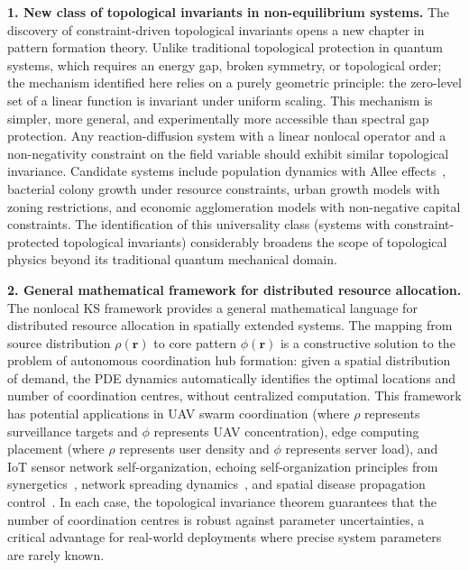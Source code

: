 \documentclass[sn-nature,pdflatex]{sn-jnl}
\begin{document}
\textbf{1. New class of topological invariants in non-equilibrium systems.}
The discovery of constraint-driven topological invariants opens a new chapter in pattern formation theory. Unlike traditional topological protection in quantum systems, which requires an energy gap, broken symmetry, or topological order; the mechanism identified here relies on a purely geometric principle: the zero-level set of a linear function is invariant under uniform scaling. This mechanism is simpler, more general, and experimentally more accessible than spectral gap protection. Any reaction-diffusion system with a linear nonlocal operator and a non-negativity constraint on the field variable should exhibit similar topological invariance. Candidate systems include population dynamics with Allee effects~\cite{meron_2015}, bacterial colony growth under resource constraints, urban growth models with zoning restrictions, and economic agglomeration models with non-negative capital constraints. The identification of this universality class (systems with constraint-protected topological invariants) considerably broadens the scope of topological physics beyond its traditional quantum mechanical domain.

\textbf{2. General mathematical framework for distributed resource allocation.}
The nonlocal KS framework provides a general mathematical language for distributed resource allocation in spatially extended systems. The mapping from source distribution $\rho(\mathbf{r})$ to core pattern $\phi(\mathbf{r})$ is a constructive solution to the problem of autonomous coordination hub formation: given a spatial distribution of demand, the PDE dynamics automatically identifies the optimal locations and number of coordination centres, without centralized computation. This framework has potential applications in UAV swarm coordination (where $\rho$ represents surveillance targets and $\phi$ represents UAV concentration), edge computing placement (where $\rho$ represents user density and $\phi$ represents server load), and IoT sensor network self-organization, echoing self-organization principles from synergetics~\cite{haken_1983}, network spreading dynamics~\cite{pastor_satorras_2015}, and spatial disease propagation control~\cite{sun_2025_physrep}. In each case, the topological invariance theorem guarantees that the number of coordination centres is robust against parameter uncertainties, a critical advantage for real-world deployments where precise system parameters are rarely known.
\end{document}
